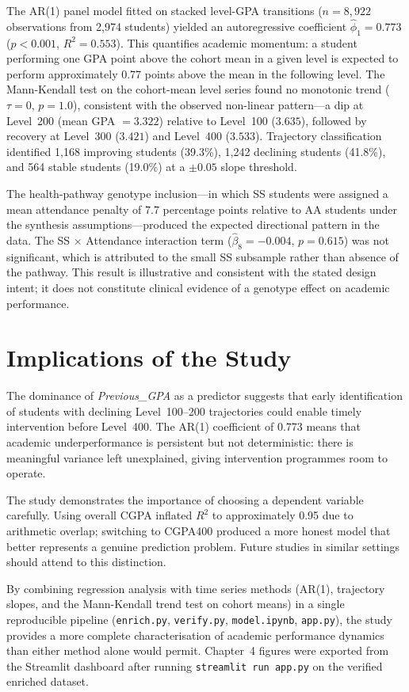 \documentclass[12pt]{report}
\begin{document}
	The AR(1) panel model fitted on stacked level-GPA transitions ($n = 8{,}922$ observations from 2,974 students) yielded an autoregressive coefficient $\hat{\phi}_1 = 0.773$ ($p < 0.001$, $R^2 = 0.553$). This quantifies academic momentum: a student performing one GPA point above the cohort mean in a given level is expected to perform approximately 0.77 points above the mean in the following level. The Mann-Kendall test on the cohort-mean level series found no monotonic trend ($\tau = 0$, $p = 1.0$), consistent with the observed non-linear pattern---a dip at Level~200 (mean GPA $= 3.322$) relative to Level~100 ($3.635$), followed by recovery at Level~300 ($3.421$) and Level~400 ($3.533$). Trajectory classification identified 1,168 improving students (39.3\%), 1,242 declining students (41.8\%), and 564 stable students (19.0\%) at a $\pm 0.05$ slope threshold.
	
	The health-pathway genotype inclusion---in which SS students were assigned a mean attendance penalty of 7.7 percentage points relative to AA students under the synthesis assumptions---produced the expected directional pattern in the data. The SS $\times$ Attendance interaction term ($\hat{\beta}_8 = -0.004$, $p = 0.615$) was not significant, which is attributed to the small SS subsample rather than absence of the pathway. This result is illustrative and consistent with the stated design intent; it does not constitute clinical evidence of a genotype effect on academic performance.
	
	\section{Implications of the Study}
	The dominance of \textit{Previous\_GPA} as a predictor suggests that early identification of students with declining Level~100--200 trajectories could enable timely intervention before Level~400. The AR(1) coefficient of 0.773 means that academic underperformance is persistent but not deterministic: there is meaningful variance left unexplained, giving intervention programmes room to operate.
	
	The study demonstrates the importance of choosing a dependent variable carefully. Using overall CGPA inflated $R^2$ to approximately 0.95 due to arithmetic overlap; switching to CGPA400 produced a more honest model that better represents a genuine prediction problem. Future studies in similar settings should attend to this distinction.
	
	By combining regression analysis with time series methods (AR(1), trajectory slopes, and the Mann-Kendall trend test on cohort means) in a single reproducible pipeline (\texttt{enrich.py}, \texttt{verify.py}, \texttt{model.ipynb}, \texttt{app.py}), the study provides a more complete characterisation of academic performance dynamics than either method alone would permit. Chapter~4 figures were exported from the Streamlit dashboard after running \texttt{streamlit run app.py} on the verified enriched dataset.
	
\end{document}
